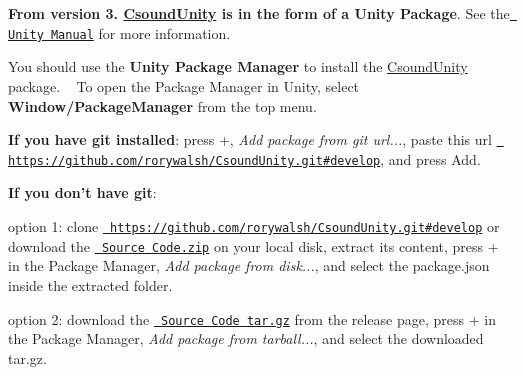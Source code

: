 {\bfseries{From version 3. \mbox{\hyperlink{class_csound_unity}{Csound\+Unity}} is in the form of a Unity Package}}. See the \href{https://docs.unity3d.com/Manual/PackagesList.html}{\texttt{ Unity Manual}} for more information. ~\newline


You should use the {\bfseries{Unity Package Manager}} to install the \mbox{\hyperlink{class_csound_unity}{Csound\+Unity}} package. ~\newline
 To open the Package Manager in Unity, select {\bfseries{Window/\+Package\+Manager}} from the top menu.

{\bfseries{If you have git installed}}\+: press +, {\itshape Add package from git url...}, paste this url \href{https://github.com/rorywalsh/CsoundUnity.git\#develop}{\texttt{ https\+://github.\+com/rorywalsh/\+Csound\+Unity.\+git\#develop}}, and press Add.

{\bfseries{If you don’t have git}}\+:
\begin{DoxyItemize}
\item option 1\+: clone \href{https://github.com/rorywalsh/CsoundUnity.git\#develop}{\texttt{ https\+://github.\+com/rorywalsh/\+Csound\+Unity.\+git\#develop}} or download the \href{https://github.com/rorywalsh/CsoundUnity/archive/refs/tags/v3.0.zip}{\texttt{ Source Code.\+zip}} on your local disk, extract its content, press + in the Package Manager, {\itshape Add package from disk...}, and select the package.\+json inside the extracted folder. ~\newline

\item option 2\+: download the \href{https://github.com/rorywalsh/CsoundUnity/archive/refs/tags/v3.0.tar.gz}{\texttt{ Source Code tar.\+gz}} from the release page, press + in the Package Manager, {\itshape Add package from tarball...}, and select the downloaded tar.\+gz. 
\end{DoxyItemize}